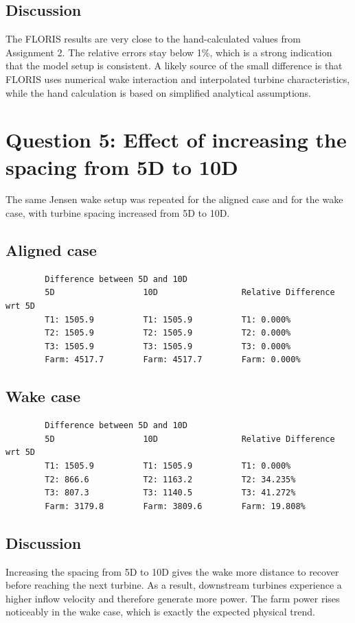 \documentclass[11pt,a4paper]{article}
\begin{document}
	\subsection{Discussion}
	The FLORIS results are very close to the hand-calculated values from Assignment 2. The relative errors stay below 1\%, which is a strong indication that the model setup is consistent. A likely source of the small difference is that FLORIS uses numerical wake interaction and interpolated turbine characteristics, while the hand calculation is based on simplified analytical assumptions.
	
	\section{Question 5: Effect of increasing the spacing from 5D to 10D}
	The same Jensen wake setup was repeated for the aligned case and for the wake case, with turbine spacing increased from 5D to 10D.
	
	\subsection{Aligned case}
	\begin{lstlisting}
		Difference between 5D and 10D
		5D                  10D                 Relative Difference wrt 5D
		T1: 1505.9          T1: 1505.9          T1: 0.000%
		T2: 1505.9          T2: 1505.9          T2: 0.000%
		T3: 1505.9          T3: 1505.9          T3: 0.000%
		Farm: 4517.7        Farm: 4517.7        Farm: 0.000%
	\end{lstlisting}
	
	\subsection{Wake case}
	\begin{lstlisting}
		Difference between 5D and 10D
		5D                  10D                 Relative Difference wrt 5D
		T1: 1505.9          T1: 1505.9          T1: 0.000%
		T2: 866.6           T2: 1163.2          T2: 34.235%
		T3: 807.3           T3: 1140.5          T3: 41.272%
		Farm: 3179.8        Farm: 3809.6        Farm: 19.808%
	\end{lstlisting}
	
	\subsection{Discussion}
	Increasing the spacing from 5D to 10D gives the wake more distance to recover before reaching the next turbine. As a result, downstream turbines experience a higher inflow velocity and therefore generate more power. The farm power rises noticeably in the wake case, which is exactly the expected physical trend.
	
\end{document}
